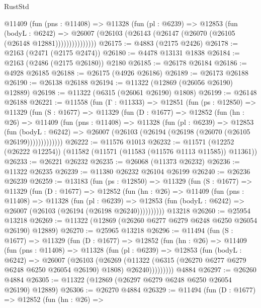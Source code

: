 \begin{lexlean}{RustStd}
\begin{coremodule}
              @11409
                (fun (pns : @11408) =>
                @11328
                  (fun (pl : @6239) =>
                  @12853
                    (fun (bodyL : @6242) =>
                    @26007 (@26103 (@26143 (@26147 (@26070 (@26105 (@26148 @12881)))))))))))))))
@26175 := @4883 (@2175 @2426)
@26178 := @2163 (@2471 (@2175 @2474))
@26180 := @4478 @13131 @1838
@26184 := @2163 (@2486 (@2175 @26180)) @2180
@26185 := @26178 @26184
@26186 := @4928 @26185
@26188 := @26175 (@4926 @26186)
@26189 := @26173 @26188
@26190 := @26138 @26188
@26194 := @11322 (@12869 (@26056 @26190) @12889)
@26198 := @11322 (@6315 (@26061 @26190) @1808)
@26199 := @26148 @26188
@26221 := @11558
    (fun (Γ : @11333) =>
    @12851
      (fun (ps : @12850) =>
      @11329
        (fun (S : @1677) =>
        @11329
          (fun (D : @1677) =>
          @12852
            (fun (hn : @26) =>
            @11409
              (fun (pns : @11408) =>
              @11328
                (fun (pl : @6239) =>
                @12853
                  (fun (bodyL : @6242) =>
                  @26007 (@26103 (@26194 (@26198 (@26070 (@26105 @26199)))))))))))))
@26222 := @11576 @1013
@26232 := @11571 (@12252 (@26222 @12254)) (@11582 (@11571 (@11583 (@11576 @1113 @11585)) @11361))
@26233 := @26221 @26232
@26235 := @26068 (@11373 @26232)
@26236 := @11322 @26235
@26239 := @11380 @26232 @26104 @26199
@26240 := @26236 @26239
@26259 := @13183
    (fun (ps : @12850) =>
    @11329
      (fun (S : @1677) =>
      @11329
        (fun (D : @1677) =>
        @12852
          (fun (hn : @26) =>
          @11409
            (fun (pns : @11408) =>
            @11328
              (fun (pl : @6239) =>
              @12853 (fun (bodyL : @6242) => @26007 (@26103 (@26194 (@26198 @26240))))))))))
    @13218
@26260 := @25954 @13218
@26269 := @11322 (@12869 (@26260 @6277 @6279 @6248 @6250 @26054 @26190) @12889)
@26270 := @25965 @13218
@26296 := @11494
    (fun (S : @1677) =>
    @11329
      (fun (D : @1677) =>
      @12852
        (fun (hn : @26) =>
        @11409
          (fun (pns : @11408) =>
          @11328
            (fun (pl : @6239) =>
            @12853
              (fun (bodyL : @6242) =>
              @26007
                (@26103
                  (@26269
                    (@11322
                      (@6315 (@26270 @6277 @6279 @6248 @6250 @26054 @26190) @1808)
                      @26240)))))))))
    @4884
@26297 := @26260 @4884
@26305 := @11322 (@12869 (@26297 @6279 @6248 @6250 @26054 @26190) @12889)
@26306 := @26270 @4884
@26329 := @11494
    (fun (D : @1677) =>
    @12852
      (fun (hn : @26) =>

\end{coremodule}
\end{lexlean}
